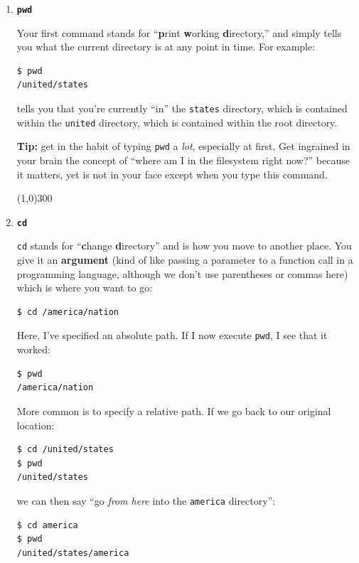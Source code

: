 \newcommand{\bigline}{\begin{center} \line(1,0){300} \end{center}}


\begin{enumerate}
\itemsep.1em
\item \textbf{\texttt{pwd}}

Your first command stands for ``\textbf{p}rint \textbf{w}orking
\textbf{d}irectory,'' and simply tells you what the current directory is at any
point in time. For example:

\begin{verbatim}
$ pwd
/united/states
\end{verbatim}

tells you that you're currently ``in'' the \texttt{states} directory, which is
contained within the \texttt{united} directory, which is contained within the
root directory.

\textbf{Tip:} get in the habit of typing \texttt{pwd} a \textit{lot},
especially at first. Get ingrained in your brain the concept of ``where am I
in the filesystem right now?'' because it matters, yet is not in your face
except when you type this command.

\bigline
\item \textbf{\texttt{cd}}

\texttt{cd} stands for ``\textbf{c}hange \textbf{d}irectory'' and is how you
move to another place. You give it an \textbf{argument} (kind of like passing
a parameter to a function call in a programming language, although we don't
use parentheses or commas here) which is where you want to go:

\begin{verbatim}
$ cd /america/nation
\end{verbatim}

Here, I've specified an absolute path. If I now execute \texttt{pwd}, I see
that it worked:
\begin{verbatim}
$ pwd
/america/nation
\end{verbatim}

More common is to specify a relative path. If we go back to our original
location:

\begin{verbatim}
$ cd /united/states
$ pwd
/united/states
\end{verbatim}

we can then say ``go \textit{from here} into the \texttt{america} directory'':

\begin{verbatim}
$ cd america
$ pwd
/united/states/america
\end{verbatim}


\end{enumerate}
